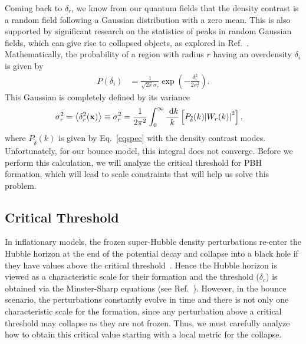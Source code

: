 \documentclass[a4paper,11pt]{article}
\renewcommand{\vec}{\mathbf}
\begin{document}
Coming back to $\delta_r$, we know from our quantum fields that the density contrast is
a random field following a Gaussian distribution with a zero mean. This is also
supported by significant research on the statistics of peaks in random Gaussian fields,
which can give rise to collapsed objects, as explored in
Ref.~\cite{Bardeen1986statistics}. Mathematically, the probability of a region with
radius $r$ having an overdensity $\delta_i$ is given by
\begin{align}
	\label{gaussdelta}
	P(\delta_i) & = \frac{1}{\sqrt{2\pi} \sigma_r} \exp(-\frac{\delta^2_i}{2 \sigma_r^2})
	.\end{align}
This Gaussian is completely defined by its variance
\begin{align}
	\label{eqsigmar}
	\sigma_r^2 & =\left< \delta_r^2(\vec{x}) \right> \equiv \sigma_r^2 = \frac{1}{2\pi^2} \int_0^\infty \frac{ \mathrm{~d}{k}}{k}\left[ P_{\tilde{\delta}}(k) \abs{W_r(k)}^2\right]
	,\end{align}
where $P_{\tilde{\delta}}(k)$ is given by Eq.~\eqref{eqspec} with the density contrast
modes. Unfortunately, for our bounce model, this integral does not converge. Before we
perform this calculation, we will analyze the critical threshold for PBH formation,
which will lead to scale constraints that will help us solve this problem.
\subsection{Critical Threshold}

\label{critical_delta}
In inflationary models, the frozen super-Hubble density perturbations re-enter the
Hubble horizon at the end of the potential decay and collapse into a black hole if they
have values above the critical threshold~\cite{Martin2014}. Hence the Hubble horizon is
viewed as a characteristic scale for their formation and the threshold ($\delta_c$) is
obtained via the Minster-Sharp equations (see Ref.~\cite{Musco2019}). However, in the
bounce scenario, the perturbations constantly evolve in time and there is not only one
characteristic scale for the formation, since any perturbation above a critical
threshold may collapse as they are not frozen. Thus, we must carefully analyze how to
obtain this critical value starting with a local metric for the collapse.
\end{document}
